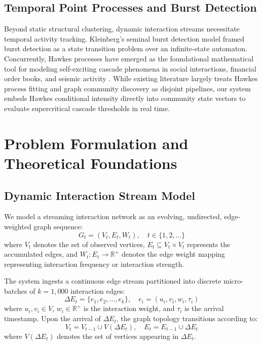 \documentclass[10pt,journal,compsoc]{IEEEtran}
\begin{document}
\subsection{Temporal Point Processes and Burst Detection}
Beyond static structural clustering, dynamic interaction streams necessitate temporal activity tracking. Kleinberg's seminal burst detection model \cite{kleinberg2003bursty} framed burst detection as a state transition problem over an infinite-state automaton. Concurrently, Hawkes processes \cite{hawkes1971spectra} have emerged as the foundational mathematical tool for modeling self-exciting cascade phenomena in social interactions, financial order books, and seismic activity \cite{zhao2015seismic}. While existing literature largely treats Hawkes process fitting and graph community discovery as disjoint pipelines, our system embeds Hawkes conditional intensity directly into community state vectors to evaluate supercritical cascade thresholds in real time.

\section{Problem Formulation and Theoretical Foundations}\label{sec:formulation}

\subsection{Dynamic Interaction Stream Model}
We model a streaming interaction network as an evolving, undirected, edge-weighted graph sequence:
\begin{equation}
G_t = (V_t, E_t, W_t), \quad t \in \{1, 2, \dots\}
\end{equation}
where $V_t$ denotes the set of observed vertices, $E_t \subseteq V_t \times V_t$ represents the accumulated edges, and $W_t: E_t \to \mathbb{R}^+$ denotes the edge weight mapping representing interaction frequency or interaction strength.

The system ingests a continuous edge stream partitioned into discrete micro-batches of $k = 1,000$ interaction edges:
\begin{equation}
\Delta E_t = \{e_1, e_2, \dots, e_k\}, \quad e_i = (u_i, v_i, w_i, \tau_i)
\end{equation}
where $u_i, v_i \in V$, $w_i \in \mathbb{R}^+$ is the interaction weight, and $\tau_i$ is the arrival timestamp. Upon the arrival of $\Delta E_t$, the graph topology transitions according to:
\begin{equation}
V_t = V_{t-1} \cup V(\Delta E_t), \quad E_t = E_{t-1} \cup \Delta E_t
\end{equation}
where $V(\Delta E_t)$ denotes the set of vertices appearing in $\Delta E_t$.
\end{document}
